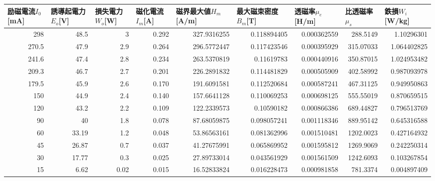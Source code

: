 \begin{tabular}{rrrrrrrrr}
\toprule
\multicolumn{1}{l}{励磁電流$I_0$[mA]} & \multicolumn{1}{l}{誘導起電力$E_o$[V]} & \multicolumn{1}{l}{損失電力$W_o$[W]} & \multicolumn{1}{l}{磁化電流$I_m$[A]} & \multicolumn{1}{l}{磁界最大値$H_m$[A/m]} & \multicolumn{1}{l}{最大磁束密度$B_m$[T]} & \multicolumn{1}{l}{透磁率$\mu_e$[H/m]} & \multicolumn{1}{l}{比透磁率$\mu_s$} & \multicolumn{1}{l}{鉄損$W_i$[W/kg]} \\
\midrule
298   & 48.5  & 3     & 0.292 & 327.9316255 & 0.118894405 & 0.000362559 & 288.5149 & 1.10296301 \\
270.5 & 47.9  & 2.9   & 0.264 & 296.5772447 & 0.117423546 & 0.000395929 & 315.07033 & 1.064402825 \\
241.6 & 47.4  & 2.8   & 0.234 & 263.5370819 & 0.11619783 & 0.000440916 & 350.87015 & 1.024953482 \\
209.3 & 46.7  & 2.7   & 0.201 & 226.2891832 & 0.114481829 & 0.000505909 & 402.58992 & 0.987093978 \\
179.5 & 45.9  & 2.6   & 0.170 & 191.6091581 & 0.112520684 & 0.000587241 & 467.31125 & 0.949950863 \\
150   & 44.9  & 2.4   & 0.140 & 157.6641128 & 0.110069253 & 0.000698125 & 555.55019 & 0.870659515 \\
120   & 43.2  & 2.2   & 0.109 & 122.2339573 & 0.10590182 & 0.000866386 & 689.44827 & 0.796513769 \\
90    & 40    & 1.8   & 0.078 & 87.68059875 & 0.098057241 & 0.001118346 & 889.95142 & 0.645316588 \\
60    & 33.19 & 1.2   & 0.048 & 53.86563161 & 0.081362996 & 0.001510481 & 1202.0023 & 0.427164932 \\
45    & 26.87 & 0.7   & 0.037 & 41.27675991 & 0.065869952 & 0.001595812 & 1269.9069 & 0.242250314 \\
30    & 17.77 & 0.3   & 0.025 & 27.89733014 & 0.043561929 & 0.001561509 & 1242.6093 & 0.103267854 \\
15    & 6.62  & 0.02  & 0.015 & 16.52833824 & 0.016228473 & 0.000981858 & 781.3374 & 0.004897409 \\
\bottomrule
\end{tabular}